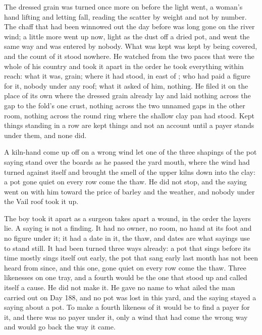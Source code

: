 The dressed grain was turned once more on  before the light went, a woman's hand lifting and letting fall, reading the scatter by weight and not by number. The chaff that had been winnowed out the day before was long gone on the river wind; a little more went up now, light as the dust off a dried pot, and went the same way and was entered by nobody. What was kept was kept by being covered, and the count of it stood nowhere. He watched from the two paces that were the whole of his country and took it apart in the order he took everything within reach: what it was, grain; where it had stood, in  east of ; who had paid a figure for it, nobody under any roof; what it asked of him, nothing. He filed it on the place of its own where the dressed grain already lay and laid nothing across the gap to the fold's one crust, nothing across the two unnamed gaps in the other room, nothing across the round ring where the shallow clay pan had stood. Kept things standing in a row are kept things and not an account until a payer stands under them, and none did.

\scenebreak

A kiln-hand come up off  on a wrong wind let one of the three shapings of the pot saying stand over the boards as he passed the yard mouth, where the wind had turned against itself and brought the smell of the upper kilns down into the clay: a pot gone quiet on every row come the thaw. He did not stop, and the saying went on with him toward the price of barley and the weather, and nobody under the Vail roof took it up.

The boy took it apart as a surgeon takes apart a wound, in the order the layers lie. A saying is not a finding. It had no owner, no room, no hand at its foot and no figure under it; it had a date in it, the thaw, and dates are what sayings use to stand still. It had been turned three ways already: a pot that sings before its time mostly sings itself out early, the pot that sang early last month has not been heard from since, and this one, gone quiet on every row come the thaw. Three likenesses on one tray, and a fourth would be the one that stood up and called itself a cause. He did not make it. He gave no name to what ailed the man carried out on Day 188, and no pot was lost in this yard, and the saying stayed a saying about a pot. To make a fourth likeness of it would be to find a payer for it, and there was no payer under it, only a wind that had come the wrong way and would go back the way it came.

